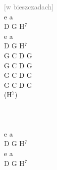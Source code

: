 \documentclass[a5paper, 10pt]{book}
\begin{document}
\begin{minipage}[t]{0.17\textwidth}
  \textcolor{gray}{\footnotesize [w bieszczadach]}\\
  e a\\
  D G H$^7$\\
  e a\\
  D G H$^7$\\

  G C D G\\
  G C D G\\
  G C D G\\
  G C D G\\(H$^7$)\\

  ~\\~\\~\\

  e a\\
  D G H$^7$\\
  e a\\
  D G H$^7$\\
\end{minipage}

\newpage
\end{document}
